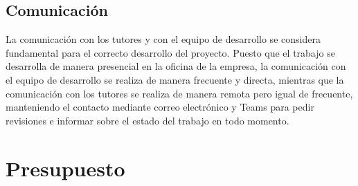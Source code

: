 \subsection{Comunicación}\label{subsec:comunicación}
La comunicación con los tutores y con el equipo de desarrollo se considera fundamental para el
correcto desarrollo del proyecto. Puesto que el trabajo se desarrolla de manera presencial en
la oficina de la empresa, la comunicación con el equipo de desarrollo se realiza de manera
frecuente y directa, mientras que la comunicación con los tutores se realiza de manera remota
pero igual de frecuente, manteniendo el contacto mediante correo electrónico y Teams para
pedir revisiones e informar sobre el estado del trabajo en todo momento.
\newpage{}
\section{Presupuesto}\label{sec:presupuesto}

